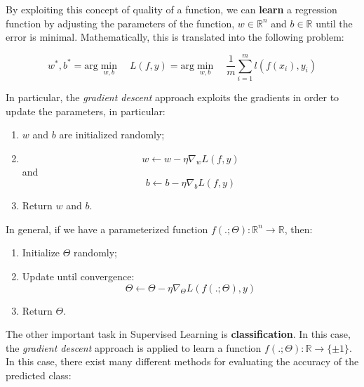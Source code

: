 By exploiting this concept of quality of a function, we can \textbf{learn} a regression function by adjusting the parameters of the function, $w \in \mathbb{R}^n$ and $b \in \mathbb{R}$ until the error is minimal. Mathematically, this is translated into the following problem:

$$
w^*,b^* = \text{arg}\min_{w,b} \quad L(f,y) = \text{arg}\min_{w,b} \quad \frac{1}{m} \sum \limits_{i = 1}^m l(f(x_i), y_i)
$$

In particular, the \textit{gradient descent} approach exploits the gradients in order to update the parameters, in particular:

\begin{enumerate}
    \item $w$ and $b$ are initialized randomly;
    \item $$
            w \xleftarrow{} w - \eta \nabla_{w} L(f,y)
            $$
            and
            $$
            b \xleftarrow{} b - \eta \nabla_{b} L(f,y)
            $$
    \item Return $w$ and $b$.
\end{enumerate}

In general, if we have a parameterized function $f(.; \Theta) : \mathbb{R}^n \to \mathbb{R}$, then:

\begin{enumerate}
    \item Initialize $\Theta$ randomly;
    \item Update until convergence:
    $$
    \Theta \xleftarrow{} \Theta - \eta \nabla_{\Theta} L(f(.;\Theta), y)
    $$
    \item Return $\Theta$.
\end{enumerate}

The other important task in Supervised Learning is \textbf{classification}. In this case, the \textit{gradient descent} approach is applied to learn a function $f(.;\Theta) : \mathbb{R} \to \{ \pm 1 \}$. In this case, there exist many different methods for evaluating the accuracy of the predicted class:

